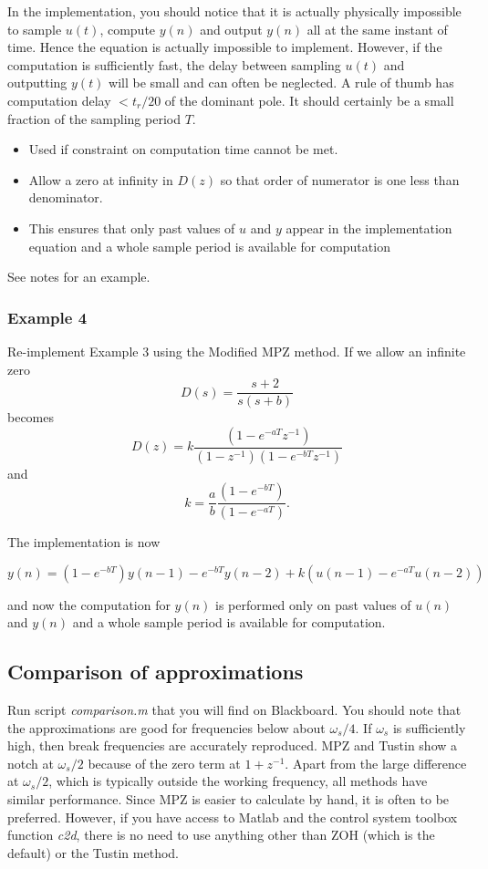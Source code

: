 In the implementation, you should notice that it is actually physically impossible to sample $u(t)$, compute $y(n)$ and output $y(n)$ all at the same instant of time. Hence the equation is actually impossible to implement. However, if the computation is sufficiently fast, the delay between sampling $u(t)$ and outputting $y(t)$ will be small and can often be neglected.  A rule of thumb has computation delay $< t_r/20$ of the dominant pole. It should certainly be a small fraction of the sampling period $T$. 

\begin{slide}\label{slides:l11s26}
	\begin{itemize}
	\item
	Used if constraint on computation time cannot be met.
	
	\item Allow a zero at infinity in $D(z)$ so that order of numerator is one less than denominator.
	
	\item This ensures that only past values of $u$ and $y$ appear in the implementation equation and a whole sample period is available for computation
	
\end{itemize}
See notes for an example.
\end{slide}

\subsubsection*{Example 4}

Re-implement Example 3 using the Modified MPZ method. If we allow an infinite zero $$D(s)=\frac{s+2}{s(s+b)}$$ becomes $$D(z)=k\frac{(1-e^{-aT}z^{-1})}{(1-z^{-1})(1-e^{-bT}z^{-1})}$$ and $$k=\frac{a}{b}\frac{(1-e^{-bT})}{(1-e^{-aT})}.$$

The implementation is now

$$y(n) = (1 - e^{-bT})y(n-1)-e^{-bT}y(n-2)+k(u(n-1)-e^{-aT}u(n-2))$$

and now the computation for $y(n)$ is performed only on past values of $u(n)$ and $y(n)$ and a whole sample period is available for computation. 

 \subsection*{Comparison of approximations}

Run script \emph{comparison.m} that you will find on Blackboard. You should note that the approximations are good for frequencies below about $\omega_s/4$. If $\omega_s$ is sufficiently high, then break frequencies are accurately reproduced. MPZ and Tustin show a notch at $\omega_s/2$ because of the zero term at $1+z^{-1}$. Apart from the large difference at $\omega_s/2$, which is typically outside the working frequency, all methods have similar performance. Since MPZ is easier to calculate by hand, it is often to be preferred. However, if you have access to Matlab and the control system toolbox function \emph{c2d}, there is no need to use anything other than ZOH (which is the default) or the Tustin method.


\endinput

